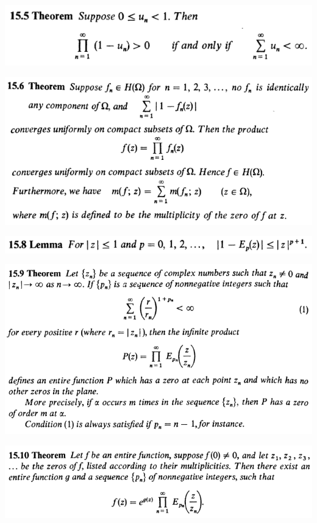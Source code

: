 \documentclass[12pt]{article}
\begin{document}
		\begin{center}
		\includegraphics{15ponto5}
		\end{center}

		\begin{center}
		\includegraphics{15ponto6}
		\end{center}

		\begin{center}
		\includegraphics{15ponto8}
		\end{center}

		\begin{center}
		\includegraphics{15ponto9}
		\end{center}

		\begin{center}
		\includegraphics{15ponto10}
		\end{center}
\end{document}
